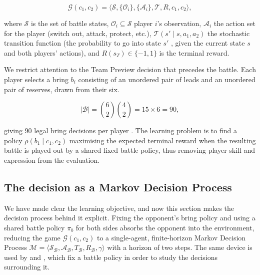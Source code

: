 \documentclass[conference]{IEEEtran}
\begin{document}
\begin{equation}
\mathcal{G}(c_1,c_2) = \langle \mathcal{S}, \{\mathcal{O}_i\}, \{\mathcal{A}_i\}, \mathcal{T}, R, c_1, c_2 \rangle ,
\label{eq:posg}
\end{equation}

\noindent where $\mathcal{S}$ is the set of battle states, $\mathcal{O}_i \subseteq \mathcal{S}$
player $i$'s observation, $\mathcal{A}_i$ the action set for the player (switch out, attack, protect, etc.),
$\mathcal{T}(s' \mid s, a_1, a_2)$ the stochastic transition function (the probability to go into state $s'$ , given the current state $s$ and both players' actions), and
$R(s_T) \in \{-1, 1\}$ is the terminal reward.

We restrict attention to the Team Preview decision that precedes the battle.
Each player selects a bring $b_i$ consisting of an unordered pair of leads and an unordered pair of reserves, drawn from their six.

\begin{equation}
|\mathcal{B}| = \binom{6}{2}\binom{4}{2} = 15 \times 6 = 90 ,
\label{eq:actionspace}
\end{equation}

\noindent giving 90 legal bring decisions per player \cite{angliss2026}.
The learning problem is to find a policy
$\rho(b_1 \mid c_1, c_2)$ maximising the expected terminal reward when the
resulting battle is played out by a shared fixed battle policy, thus removing player skill and
expression from the evaluation.

\subsection{The decision as a Markov Decision Process}
\label{sec:mdp}

We have made clear the learning objective, and now this section makes the
decision process behind it explicit. Fixing the opponent's bring policy and
using a shared battle policy $\pi_b$ for both sides absorbs the opponent into
the environment, reducing the game $\mathcal{G}(c_1,c_2)$ to a single-agent,
finite-horizon Markov Decision Process
$\mathcal{M} = \langle \mathcal{S}_{\mathcal{B}}, \mathcal{A}_{\mathcal{B}}, T_{\mathcal{B}}, R_{\mathcal{B}}, \gamma \rangle$
with a horizon of two steps. The same device is used by \cite{reis2024} and
\cite{reis2025}, which fix a battle policy in order to study the decisions
surrounding it.
\end{document}
